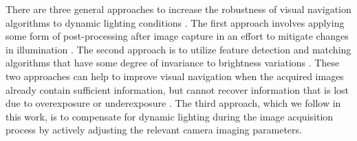 \documentclass[letterpaper, 10pt, journal, twoside]{IEEEtran}
\begin{document}
There are three general approaches to increase the robustness of visual navigation algorithms to dynamic lighting conditions \cite{Lu2010}. 
The first approach involves applying some form of post-processing after image capture in an effort to mitigate changes in illumination \cite{Clement2018, Clement2020, Gomez-Ojeda2017, Porav2018a, Park2017}.
The second approach is to utilize feature detection and matching algorithms that have some degree of invariance to brightness variations \cite{Rublee2011a, Yi2016}.
These two approaches can help to improve visual navigation when the acquired images already contain sufficient information, but cannot recover information that is lost due to overexposure or underexposure \cite{Zhang2017}.
The third approach, which we follow in this work, is to compensate for dynamic lighting during the image acquisition process by actively adjusting the relevant camera imaging parameters.
 
\end{document}
